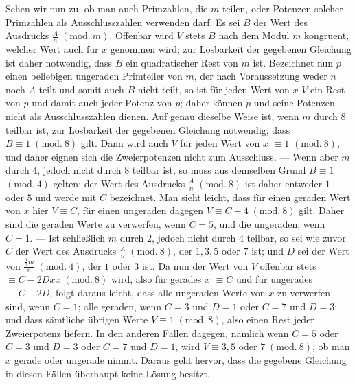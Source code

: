 \enlargethispage{\baselineskip}
Sehen wir nun zu, ob man auch Primzahlen, die \(m\) teilen, oder Potenzen solcher Primzahlen als Ausschlusszahlen verwenden darf. Es sei \(B\) der Wert des Ausdrucks \(\frac An\; (\mathrm{mod}.\ m)\). Offenbar wird \(V\) stets \(B\) nach dem Modul \(m\) kongruent, welcher Wert auch für \(x\) genommen wird; zur Lösbarkeit der gegebenen Gleichung ist daher notwendig, dass \(B\) ein quadratischer Rest von \(m\) ist. Bezeichnet nun \(p\) einen beliebigen ungeraden Primteiler von \(m\), der nach Voraussetzung weder \(n\) noch \(A\) teilt und somit auch \(B\) nicht teilt, so ist für jeden Wert von \(x\) \(V\) ein Rest von \(p\) und damit auch jeder Potenz von \(p\); daher können \(p\) und seine Potenzen nicht als Ausschlusszahlen dienen. Auf genau dieselbe Weise ist, wenn \(m\) durch \(8\) teilbar ist, zur Lösbarkeit der gegebenen Gleichung notwendig, dass \(B\equiv1\; (\mathrm{mod}.\ 8)\) gilt. Dann wird auch \(V\) für jeden Wert von \(x\) \(\equiv1\) \((\mathrm{mod.}\ 8)\), und daher eignen sich die Zweierpotenzen nicht zum Ausschluss. — Wenn aber
\(m\) durch \(4\), jedoch nicht durch \(8\) teilbar ist, so muss aus demselben Grund \(B\equiv1\) \((\mathrm{mod.}\ 4)\) gelten; der Wert des Ausdrucks \(\frac An\; (\mathrm{mod}.\ 8)\) ist daher entweder \(1\) oder \(5\) und werde mit \(C\) bezeichnet. Man sieht leicht, dass für einen geraden Wert von \(x\) hier \(V\equiv C\), für einen ungeraden dagegen \(V\equiv C+4\; (\mathrm{mod}.\ 8)\) gilt. Daher sind die geraden Werte zu verwerfen, wenn \(C=5\), und die ungeraden, wenn \(C=1\). — Ist schließlich \(m\) durch \(2\), jedoch nicht durch \(4\) teilbar, so sei wie zuvor \(C\) der Wert des Ausdrucks \(\frac An\; (\mathrm{mod}.\ 8)\), der \(1,\allowbreak 3,\allowbreak 5\) oder \(7\) ist; und \(D\) sei der Wert von \(\frac{\frac12m}{n}\; (\mathrm{mod}.\ 4)\), der \(1\) oder \(3\) ist. Da nun der Wert von \(V\) offenbar stets \(\equiv C-2Dxx\; (\mathrm{mod}.\ 8)\) wird, also für gerades \(x\) \(\equiv C\) und für ungerades \(\equiv C-2D\), folgt daraus leicht, dass alle ungeraden Werte von \(x\) zu verwerfen sind, wenn \(C=1\); alle geraden, wenn \(C=3\) und \(D=1\) oder \(C=7\) und \(D=3\); und dass sämtliche übrigen Werte \(V\equiv1\; (\mathrm{mod}.\ 8)\), also einen Rest jeder Zweierpotenz liefern. In den anderen Fällen dagegen, nämlich wenn \(C=5\) oder \(C=3\) und \(D=3\) oder \(C=7\) und \(D=1\), wird \(V\equiv3,\allowbreak 5\) oder \(7\; (\mathrm{mod}.\ 8)\), ob man \(x\) gerade oder ungerade nimmt. Daraus geht hervor, dass die gegebene Gleichung in diesen Fällen überhaupt keine Lösung besitzt.

